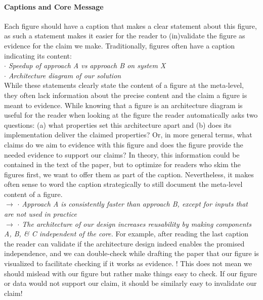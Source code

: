 \documentclass[review, anonymous, acmsmall, screen]{acmart}
\newenvironment{draftonly}{}{}
\begin{document}
\begin{draftonly}
\paragraph{Captions and Core Message}
\label{appendix:captions}

Each figure should have a caption that makes a clear statement about this
figure, as such a statement makes it easier for the reader to (in)validate the
figure as evidence for the claim we make. Traditionally, figures often have a
caption indicating its content:\\ {\color{pairedTwoDarkBlue} \textit{$\cdot$
Speedup of approach A vs approach B on system X}}\\ {\color{pairedTwoDarkBlue}
\textit{$\cdot$ Architecture diagram of our solution}}\\ While these statements
clearly state the content of a figure at the meta-level, they often lack
information about the precise content and the claim a figure is meant to
evidence. While knowing that a figure is an architecture diagram is useful for
the reader when looking at the figure the reader automatically asks two
questions: (a) what properties set this architecture apart and (b) does its
implementation deliver the claimed properties? Or, in more general terms, what
claims do we aim to evidence with this figure and does the figure provide the
needed evidence to support our claims? In theory, this information could be
contained in the text of the paper, but to optimize for readers who skim the
figures first, we want to offer them as part of the caption. Nevertheless, it
makes often sense to word the caption strategically to still document the
meta-level content of a figure.\\ $\to$ {\color{pairedFourDarkGreen}
\textit{$\cdot$ Approach A is consistently faster than approach B, except for
inputs that are not used in practice}}\\ $\to$ {\color{pairedFourDarkGreen}
\textit{$\cdot$ The architecture of our design increases reusability by making
components A, B, \& C independent of the core.}} For example, after reading the
last caption the reader can validate if the architecture design indeed enables
the promised independence, and we can double-check while drafting the paper that
our figure is visualized to facilitate checking if it works as evidence. ! This
does not mean we should mislead with our figure but rather make things easy to
check. If our figure or data would not support our claim, it should be similarly
easy to invalidate our claim!


\end{draftonly}
\end{document}
